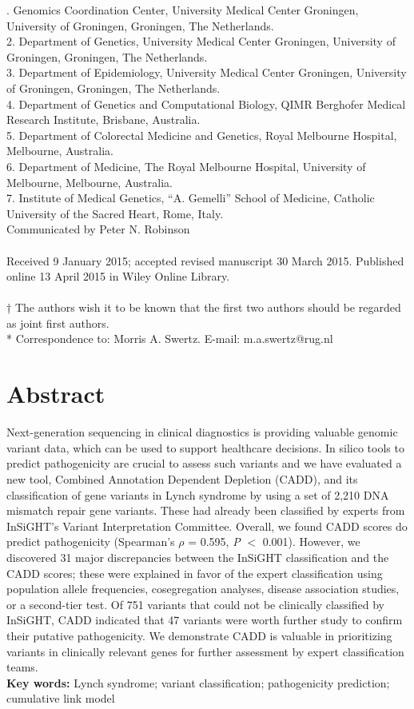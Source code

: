 . Genomics Coordination Center, University Medical Center Groningen, University of Groningen, Groningen, The Netherlands.\\
2. Department of Genetics, University Medical Center Groningen, University of Groningen, Groningen, The Netherlands.\\
3. Department of Epidemiology, University Medical Center Groningen, University of Groningen, Groningen, The Netherlands.\\
4. Department of Genetics and Computational Biology, QIMR Berghofer Medical Research Institute, Brisbane, Australia.\\
5. Department of Colorectal Medicine and Genetics, Royal Melbourne Hospital, Melbourne, Australia.\\
6. Department of Medicine, The Royal Melbourne Hospital, University of Melbourne, Melbourne, Australia.\\
7. Institute of Medical Genetics, “A. Gemelli” School of Medicine, Catholic University of the Sacred Heart, Rome, Italy.\\

\noindent
Communicated by Peter N. Robinson
\\~\\
Received 9 January 2015; accepted revised manuscript 30 March 2015. Published online 13 April 2015 in Wiley Online Library.
\\~\\
† The authors wish it to be known that the first two authors should be regarded as joint first authors.\\
* Correspondence to: Morris A. Swertz. E-mail: m.a.swertz@rug.nl

\section*{Abstract}
Next-generation sequencing in clinical diagnostics is providing valuable genomic variant data, which can be used to support healthcare decisions.
In silico tools to predict pathogenicity are crucial to assess such variants and we have evaluated a new tool, Combined Annotation Dependent Depletion (CADD), and its classification of gene variants in Lynch syndrome by using a set of 2,210 DNA mismatch repair gene variants. These had already been classified by experts from InSiGHT’s Variant Interpretation Committee.
Overall, we found CADD scores do predict pathogenicity (Spearman’s $\rho$ = 0.595, \textsl{P} $<$ 0.001). However, we discovered 31 major discrepancies between the InSiGHT classification and the CADD scores; these were explained in favor of the expert classification using population allele frequencies, cosegregation analyses, disease association studies, or a second-tier test.
Of 751 variants that could not be clinically classified by InSiGHT, CADD indicated that 47 variants were worth further study to confirm their putative pathogenicity.
We demonstrate CADD is valuable in prioritizing variants in clinically relevant genes for further assessment by expert classification teams.\\
\textbf{Key words:} Lynch syndrome; variant classification; pathogenicity prediction; cumulative link model

